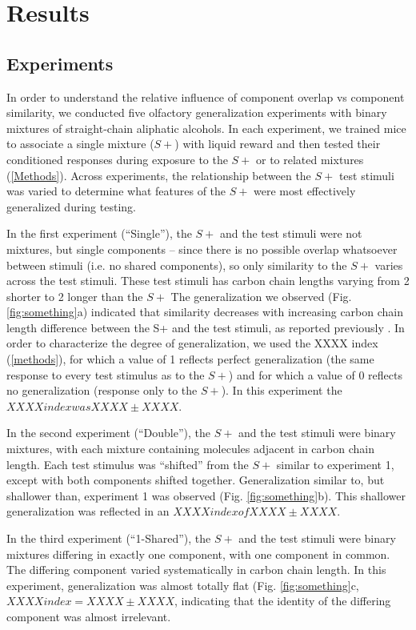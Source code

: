 \section{Results}

\subsection{Experiments}
In order to understand the relative influence of component overlap vs component similarity, we conducted five olfactory generalization experiments with binary mixtures of straight-chain aliphatic alcohols.  In each experiment, we trained mice to associate a single mixture ($S+$) with liquid reward and then tested their conditioned responses during exposure to the $S+$ or to related mixtures (\ref{Methods}).  Across experiments, the relationship between the $S+$ test stimuli was varied to determine what features of the $S+$ were most effectively generalized during testing.  

In the first experiment (``Single''), the $S+$ and the test stimuli were not mixtures, but single components -- since there is no possible overlap whatsoever between stimuli (i.e. no shared components), so only similarity to the $S+$ varies across the test stimuli.  These test stimuli has carbon chain lengths varying from 2 shorter to 2 longer than the $S+$  The generalization we observed (Fig. \ref{fig:something}a) indicated that similarity decreases with increasing carbon chain length difference between the S+ and the test stimuli, as reported previously \cite{18810459}\cite{24488965}.  In order to characterize the degree of generalization, we used the XXXX index (\ref{methods}), for which a value of 1 reflects perfect generalization (the same response to every test stimulus as to the $S+$) and for which a value of 0 reflects no generalization (response only to the $S+$).  In this experiment the $XXXX index was XXXX \pm XXXX$.  

In the second experiment (``Double''), the $S+$ and the test stimuli were binary mixtures, with each mixture containing molecules adjacent in carbon chain length.  Each test stimulus was ``shifted'' from the $S+$ similar to experiment 1, except with both components shifted together.  Generalization similar to, but shallower than, experiment 1 was observed (Fig. \ref{fig:something}b).  This shallower generalization was reflected in an $XXXX index of XXXX \pm XXXX$.  

In the third experiment (``1-Shared''), the $S+$ and the test stimuli were binary mixtures differing in exactly one component, with one component in common.  The differing component varied systematically in carbon chain length.  In this experiment, generalization was almost totally flat (Fig. \ref{fig:something}c, $XXXX index = XXXX \pm XXXX$, indicating that the identity of the differing component was almost irrelevant.  

